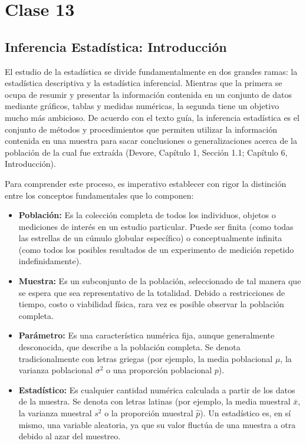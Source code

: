 \chapter{Clase 13}

\section{Inferencia Estadística: Introducción}

El estudio de la estadística se divide fundamentalmente en dos grandes ramas: la estadística descriptiva y la estadística inferencial. Mientras que la primera se ocupa de resumir y presentar la información contenida en un conjunto de datos mediante gráficos, tablas y medidas numéricas, la segunda tiene un objetivo mucho más ambicioso. De acuerdo con el texto guía, la inferencia estadística es el conjunto de métodos y procedimientos que permiten utilizar la información contenida en una muestra para sacar conclusiones o generalizaciones acerca de la población de la cual fue extraída (Devore, Capítulo 1, Sección 1.1; Capítulo 6, Introducción).

Para comprender este proceso, es imperativo establecer con rigor la distinción entre los conceptos fundamentales que lo componen:

\begin{itemize}
    \item \textbf{Población:} Es la colección completa de todos los individuos, objetos o mediciones de interés en un estudio particular. Puede ser finita (como todas las estrellas de un cúmulo globular específico) o conceptualmente infinita (como todos los posibles resultados de un experimento de medición repetido indefinidamente).
    \item \textbf{Muestra:} Es un subconjunto de la población, seleccionado de tal manera que se espera que sea representativo de la totalidad. Debido a restricciones de tiempo, costo o viabilidad física, rara vez es posible observar la población completa.
    \item \textbf{Parámetro:} Es una característica numérica fija, aunque generalmente desconocida, que describe a la población completa. Se denota tradicionalmente con letras griegas (por ejemplo, la media poblacional $\mu$, la varianza poblacional $\sigma^2$ o una proporción poblacional $p$).
    \item \textbf{Estadístico:} Es cualquier cantidad numérica calculada a partir de los datos de la muestra. Se denota con letras latinas (por ejemplo, la media muestral $\bar{x}$, la varianza muestral $s^2$ o la proporción muestral $\hat{p}$). Un estadístico es, en sí mismo, una variable aleatoria, ya que su valor fluctúa de una muestra a otra debido al azar del muestreo.
\end{itemize}

